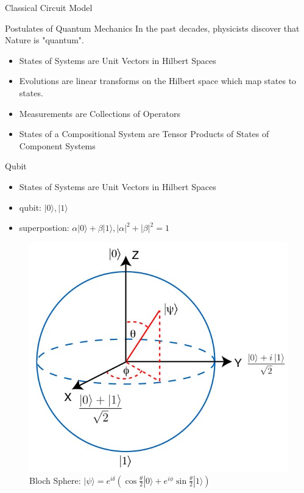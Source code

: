 \documentclass{beamer}
\newcommand{\<}{\langle}
\renewcommand{\>}{\rangle}
\begin{document}
\begin{frame}
\begin{columns}[t]
\begin{column}{.48\linewidth}
\begin{block}{Classical Circuit Model}
        \end{block}
        

        \begin{block}{Postulates of Quantum Mechanics}
        In the past decades, physicists discover that Nature is "quantum".
                \begin{itemize}
                    \item States of Systems are Unit Vectors in Hilbert Spaces
                    \item Evolutions are linear transforms on the Hilbert space which map states to states.
                    \item Measurements are Collections of Operators
                    \item States of a Compositional System are Tensor Products of States of Component Systems
                \end{itemize}
        \end{block}
        
        \begin{block}{Qubit}

            \begin{itemize}
                \item States of Systems are Unit Vectors in Hilbert Spaces
                \item qubit: $|0\>, |1\>$ 
                \item superpostion: $\alpha|0\>+\beta|1\>, |\alpha|^2+|\beta|^2=1$
            \end{itemize}
            
            \begin{figure}
                \centering
                \includegraphics[width=0.4\columnwidth]{bloch.jpg}
                \caption{Bloch Sphere: $|\psi\> = e^{i\delta}(\cos\frac\theta2|0\>+e^{i\phi}\sin\frac\theta2|1\>)$}
                \label{fig:bloch}
            \end{figure}
        
        \end{block}
    

\end{column}
\end{columns}
\end{frame}
\end{document}

